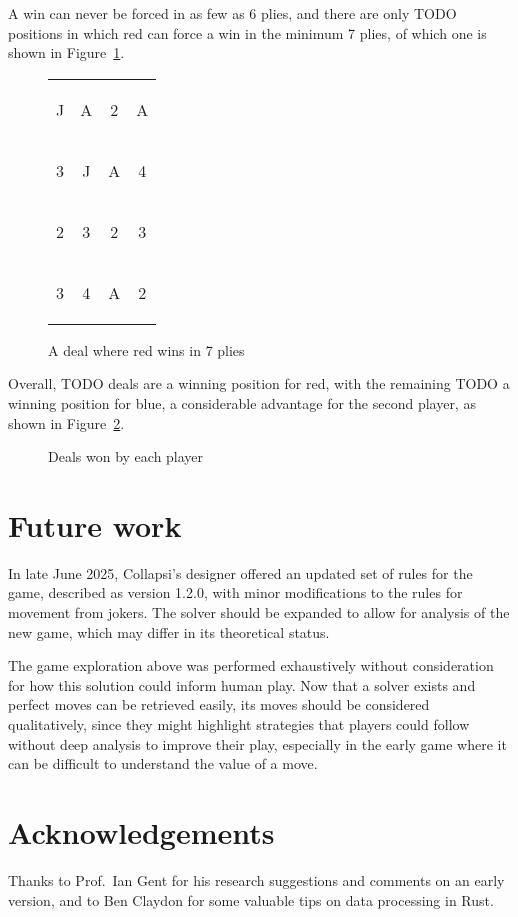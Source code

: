 \documentclass[a4paper, twocolumn]{article}
\newcommand\card[1]{\begin{tcolorbox}#1\end{tcolorbox}}
\newcommand\board[8]{
  \setlength{\tabcolsep}{0.1cm}
  \begin{tabular}{c c c c}
    \card{#1} & \card{#2} & \card{#3} & \card{#4} \\
    \card{#5} & \card{#6} & \card{#7} & \card{#8} \\
    \boardmore
}
\newcommand\boardmore[8]{
    \card{#1} & \card{#2} & \card{#3} & \card{#4} \\
    \card{#5} & \card{#6} & \card{#7} & \card{#8}
  \end{tabular}
}
\begin{document}
A win can never be forced in as few as 6 plies, and there are only TODO positions
in which red can force a win in the minimum 7 plies, of which one is shown in
Figure~\ref{fig:win-in-7}.

\begin{figure}[ht]
  \centering
  \board JA2A 3JA4 2323 34A2
  \caption{A deal where red wins in 7 plies}
  \label{fig:win-in-7}
\end{figure}

Overall, TODO deals are a winning position for red, with the remaining
TODO a winning position for blue, a considerable advantage for the second
player, as shown in Figure~\ref{fig:win-chance}.

\begin{figure}[ht]
  \centering
  \caption{Deals won by each player}
  \label{fig:win-chance}
\end{figure}


\section{Future work}

In late June 2025, Collapsi's designer offered an updated set of rules for the
game, described as version 1.2.0, with minor modifications to the rules for movement from
jokers. The solver should be expanded to allow for analysis of the new game,
which may differ in its theoretical status.

The game exploration above was performed exhaustively without consideration for how
this solution could inform human play. Now that a solver exists and perfect
moves can be retrieved easily, its moves should be considered qualitatively,
since they might highlight strategies that players could follow without deep
analysis to improve their play, especially in the early game where it can be
difficult to understand the value of a move.


\section{Acknowledgements}

Thanks to Prof.~Ian Gent for his research suggestions and comments on an early
version, and to Ben Claydon for some valuable tips on data processing in Rust.
\end{document}
